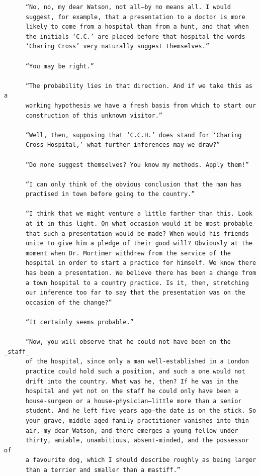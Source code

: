 \documentclass{article}
\begin{document}
\begin{verbatim}
      “No, no, my dear Watson, not all—by no means all. I would
      suggest, for example, that a presentation to a doctor is more
      likely to come from a hospital than from a hunt, and that when
      the initials ‘C.C.’ are placed before that hospital the words
      ‘Charing Cross’ very naturally suggest themselves.”

      “You may be right.”

      “The probability lies in that direction. And if we take this as a
      working hypothesis we have a fresh basis from which to start our
      construction of this unknown visitor.”

      “Well, then, supposing that ‘C.C.H.’ does stand for ‘Charing
      Cross Hospital,’ what further inferences may we draw?”

      “Do none suggest themselves? You know my methods. Apply them!”

      “I can only think of the obvious conclusion that the man has
      practised in town before going to the country.”

      “I think that we might venture a little farther than this. Look
      at it in this light. On what occasion would it be most probable
      that such a presentation would be made? When would his friends
      unite to give him a pledge of their good will? Obviously at the
      moment when Dr. Mortimer withdrew from the service of the
      hospital in order to start a practice for himself. We know there
      has been a presentation. We believe there has been a change from
      a town hospital to a country practice. Is it, then, stretching
      our inference too far to say that the presentation was on the
      occasion of the change?”

      “It certainly seems probable.”

      “Now, you will observe that he could not have been on the _staff_
      of the hospital, since only a man well-established in a London
      practice could hold such a position, and such a one would not
      drift into the country. What was he, then? If he was in the
      hospital and yet not on the staff he could only have been a
      house-surgeon or a house-physician—little more than a senior
      student. And he left five years ago—the date is on the stick. So
      your grave, middle-aged family practitioner vanishes into thin
      air, my dear Watson, and there emerges a young fellow under
      thirty, amiable, unambitious, absent-minded, and the possessor of
      a favourite dog, which I should describe roughly as being larger
      than a terrier and smaller than a mastiff.”


\end{verbatim}
\end{document}
